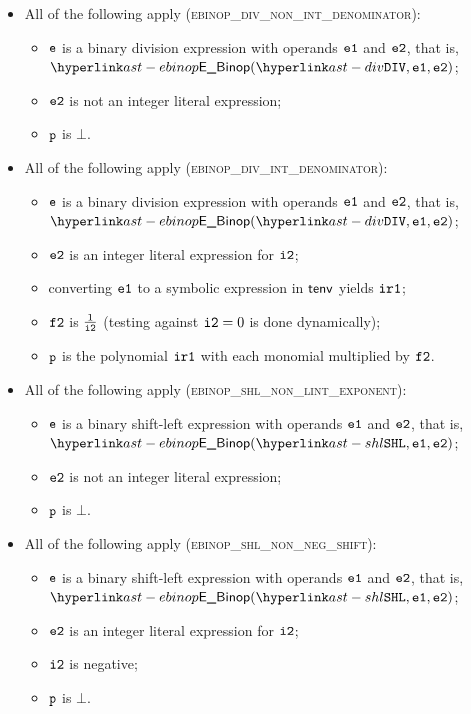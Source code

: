 \begin{itemize}
  \item All of the following apply (\textsc{ebinop\_div\_non\_int\_denominator}):
  \begin{itemize}
    \item $\texttt{e}$ is a binary division expression with operands $\texttt{e1}$ and $\texttt{e2}$, that is, \\ $\EBinop(\DIV, \veone, \vetwo)$;
    \item $\texttt{e2}$ is not an integer literal expression;
    \item $\texttt{p}$ is $\bot$.
  \end{itemize}

  \item All of the following apply (\textsc{ebinop\_div\_int\_denominator}):
  \begin{itemize}
    \item $\texttt{e}$ is a binary division expression with operands $\texttt{e1}$ and $\texttt{e2}$, that is, \\ $\EBinop(\DIV, \veone, \vetwo)$;
    \item $\texttt{e2}$ is an integer literal expression for $\texttt{i2}$;
    \item converting $\texttt{e1}$ to a symbolic expression in $\textsf{tenv}$ yields $\texttt{ir1}$\ProseOrTypeErrorOrBot;
    \item $\texttt{f2}$ is $\frac{1}{\texttt{i2}}$ (testing against $\texttt{i2} = 0$ is done dynamically);
    \item $\texttt{p}$ is the polynomial $\texttt{ir1}$ with each monomial multiplied by $\texttt{f2}$.
  \end{itemize}

  \item All of the following apply (\textsc{ebinop\_shl\_non\_lint\_exponent}):
  \begin{itemize}
    \item $\texttt{e}$ is a binary shift-left expression with operands $\texttt{e1}$ and $\texttt{e2}$, that is, \\ $\EBinop(\SHL, \veone, \vetwo)$;
    \item $\texttt{e2}$ is not an integer literal expression;
    \item $\texttt{p}$ is $\bot$.
  \end{itemize}

  \item All of the following apply (\textsc{ebinop\_shl\_non\_neg\_shift}):
  \begin{itemize}
    \item $\texttt{e}$ is a binary shift-left expression with operands $\texttt{e1}$ and $\texttt{e2}$, that is, \\ $\EBinop(\SHL, \veone, \vetwo)$;
    \item $\texttt{e2}$ is an integer literal expression for $\texttt{i2}$;
    \item $\texttt{i2}$ is negative;
    \item $\texttt{p}$ is $\bot$.
  \end{itemize}


\end{itemize}
